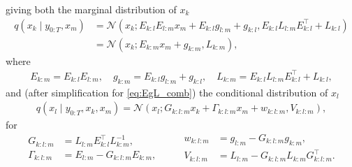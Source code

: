 giving both the marginal distribution of $x_k$
\begin{equation}
    \begin{split}
        q(x_k \mid y_{0:T}, x_m)
        &= \mathcal{N}(x_k;
        E_{k:l} E_{l:m} x_{m} + E_{k:l} g_{l:m} + g_{k:l},
        E_{k:l} L_{l:m} E_{k:l}^\top + L_{k:l} ) \\
        &= \mathcal{N}( x_k; E_{k:m} x_{m} + g_{k:m}, L_{k:m} ),
    \end{split}
\end{equation}
where
\begin{equation}
    \begin{split}
        E_{k:m} = E_{k:l} E_{l:m}, \quad g_{k:m} = E_{k:l} g_{l:m} + g_{k:l}, \quad
        L_{k:m} = E_{k:l} L_{l:m} E_{k:l}^\top + L_{k:l},
    \end{split}
    \label{eq:EgL_comb}
\end{equation}
and (after simplification for \eqref{eq:EgL_comb}) the conditional distribution of $x_l$
\begin{equation}
    \begin{split}
        q(x_l \mid y_{0:T}, x_k, x_m) = \mathcal{N}(x_l; G_{k:l:m} x_k + \Gamma_{k:l:m} x_m + w_{k:l:m}, V_{k:l:m} ),
    \end{split}
    \label{eq:gauss_l_km}
\end{equation}
for
\begin{equation}
    \label{eq:recursive_params}
    \begin{split}
        G_{k:l:m} &= L_{l:m} E_{k:l}^\top L_{k:m}^{-1}, \\
        \Gamma_{k:l:m} &= E_{l:m} - G_{k:l:m} E_{k:m},
    \end{split} \qquad
    \begin{split}
        w_{k:l:m} &= g_{l:m} - G_{k:l:m} g_{k:m}, \\
        V_{k:l:m} &= L_{l:m} - G_{k:l:m} L_{k:m} G_{k:l:m}^\top.
    \end{split}
\end{equation}

